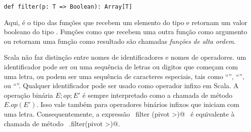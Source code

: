 \begin{lstlisting}
def filter(p: T => Boolean): Array[T]
\end{lstlisting}

Aqui,  \'{e} o tipo das fun\c{c}\~{o}es que recebem um elemento 
do tipo  e retornam um valor booleano do tipo . 
Fun\c{c}\~{o}es como  
que recebem uma outra fun\c{c}\~{a}o como argumento ou retornam uma fun\c{c}\~{a}o como
resultado s\~{a}o chamadas {\em fun\c{c}\~{o}es de alta ordem.}     

Scala n\~{a}o faz distin\c{c}\~{a}o entre nomes de identificadores e nomes de operadores.
um identificador pode ser ou uma sequ\^{e}ncia de letras ou digitos que come\c{c}am
com uma letra, ou podem ser uma sequ\^{e}ncia de caracteres especiais, tais como 
``\code{+}'', ``\code{*}'', ou ``\code{:}''.  Qualquer identificador pode
ser usado como operador infixo em Scala. A opera\c{c}\~{a}o bin\'{a}ria $E;op;E'$ \'{e} sempre
interpretado como a chamada de m\'{e}todo $E.op(E')$. Isso vale tamb\'{e}m para 
operadores bin\'{a}rios infixos que iniciam com uma letra. Consequentemente,
a express\~{a}o  ~\lstinline@xs filter (pivot >)@~ \'{e} equivalente à chamada de
m\'{e}todo ~\lstinline@xs.filter(pivot >)@.



